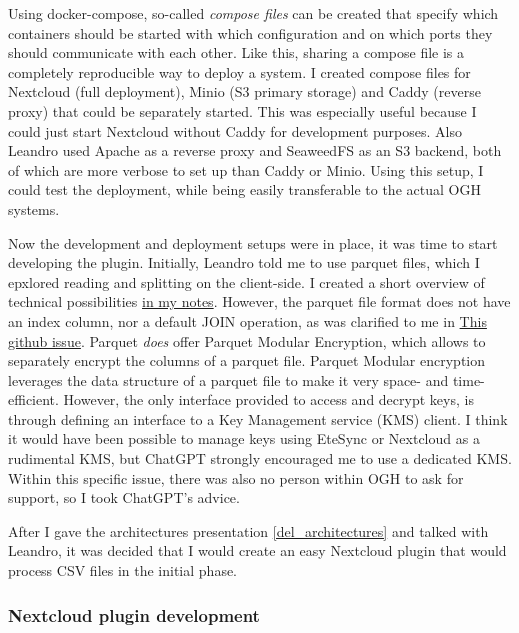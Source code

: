\documentclass[journal, dvipsnames]{IEEEtran}
\begin{document}
Using docker-compose, so-called \textit{compose files} can be created that specify which containers should be started with which configuration and on which ports they should communicate with each other. Like this, sharing a compose file is a completely reproducible way to deploy a system. I created compose files for Nextcloud (full deployment), Minio (S3 primary storage) and Caddy (reverse proxy) that could be separately started. This was especially useful because I could just start Nextcloud without Caddy for development purposes. Also Leandro used Apache as a reverse proxy and SeaweedFS as an S3 backend, both of which are more verbose to set up than Caddy or Minio. Using this setup, I could test the deployment, while being easily transferable to the actual OGH systems.

Now the development and deployment setups were in place, it was time to start developing the plugin. Initially, Leandro told me to use parquet files, which I epxlored reading and splitting on the client-side. I created a short overview of technical possibilities \href{https://docs.google.com/document/d/1R5wIZc0mxVcqyIUatDX1DlvIh9arl41VQ3EWcYc8NQE/edit?usp=sharing}{in my notes}.
However, the parquet file format does not have an index column, nor a default JOIN operation, as was clarified to me in \href{https://github.com/apache/arrow/issues/31458#issuecomment-1494961959}{This github issue}. Parquet \textit{does} offer Parquet Modular Encryption, which allows to separately encrypt the columns of a parquet file. Parquet Modular encryption leverages the data structure of a parquet file to make it very space- and time-efficient. However, the only interface provided to access and decrypt keys, is through defining an interface to a Key Management service (KMS) client. I think it would have been possible to manage keys using EteSync or Nextcloud as a rudimental KMS, but ChatGPT strongly encouraged me to use a dedicated KMS. Within this specific issue, there was also no person within OGH to ask for support, so I took ChatGPT's advice.

After I gave the architectures presentation \ref{del_architectures} and talked with Leandro, it was decided that I would create an easy Nextcloud plugin that would process CSV files in the initial phase.

\subsubsection{Nextcloud plugin development}
\end{document}
